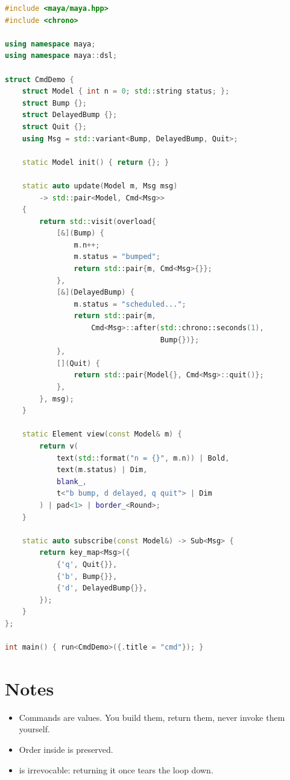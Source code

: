 \begin{lstlisting}[language=C++]
#include <maya/maya.hpp>
#include <chrono>

using namespace maya;
using namespace maya::dsl;

struct CmdDemo {
    struct Model { int n = 0; std::string status; };
    struct Bump {};
    struct DelayedBump {};
    struct Quit {};
    using Msg = std::variant<Bump, DelayedBump, Quit>;

    static Model init() { return {}; }

    static auto update(Model m, Msg msg)
        -> std::pair<Model, Cmd<Msg>>
    {
        return std::visit(overload{
            [&](Bump) {
                m.n++;
                m.status = "bumped";
                return std::pair{m, Cmd<Msg>{}};
            },
            [&](DelayedBump) {
                m.status = "scheduled...";
                return std::pair{m,
                    Cmd<Msg>::after(std::chrono::seconds(1),
                                    Bump{})};
            },
            [](Quit) {
                return std::pair{Model{}, Cmd<Msg>::quit()};
            },
        }, msg);
    }

    static Element view(const Model& m) {
        return v(
            text(std::format("n = {}", m.n)) | Bold,
            text(m.status) | Dim,
            blank_,
            t<"b bump, d delayed, q quit"> | Dim
        ) | pad<1> | border_<Round>;
    }

    static auto subscribe(const Model&) -> Sub<Msg> {
        return key_map<Msg>({
            {'q', Quit{}},
            {'b', Bump{}},
            {'d', DelayedBump{}},
        });
    }
};

int main() { run<CmdDemo>({.title = "cmd"}); }
\end{lstlisting}

\section{Notes}

\begin{itemize}[leftmargin=*]
  \item Commands are values. You build them, return them,
    never invoke them yourself.
  \item Order inside  is preserved.
  \item {} is irrevocable: returning it once tears
    the loop down.
\end{itemize}


